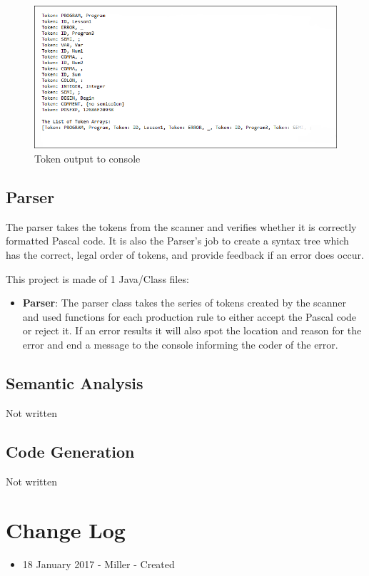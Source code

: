 \documentclass[english]{article}
\begin{document}
\begin{figure}
\begin{center}
\includegraphics[width=1.1\textwidth]{output.PNG}
\end{center}
\caption{\label{Output}Token output to console}
\end{figure}


\subsection{Parser}

The parser takes the tokens from the scanner and verifies whether it is correctly formatted Pascal code. It is also the Parser’s job to create a syntax tree which has the correct, legal order of tokens, and provide feedback if an error does occur.

This project is made of 1 Java/Class files:

\begin{itemize}

\item
\textbf{Parser}: The parser class takes the series of tokens created by the scanner and used functions for each production rule to either accept the Pascal code or reject it. If an error results it will also spot the location and reason for the error and end a message to the console informing the coder of the error.

\end{itemize}

\subsection{Semantic Analysis}

Not written

\subsection{Code Generation}

Not written



\par\addvspace{1cm}%
\section{Change Log}

\begin{itemize}
\item
18 January 2017 - Miller - Created

\end{itemize}
\end{document}
